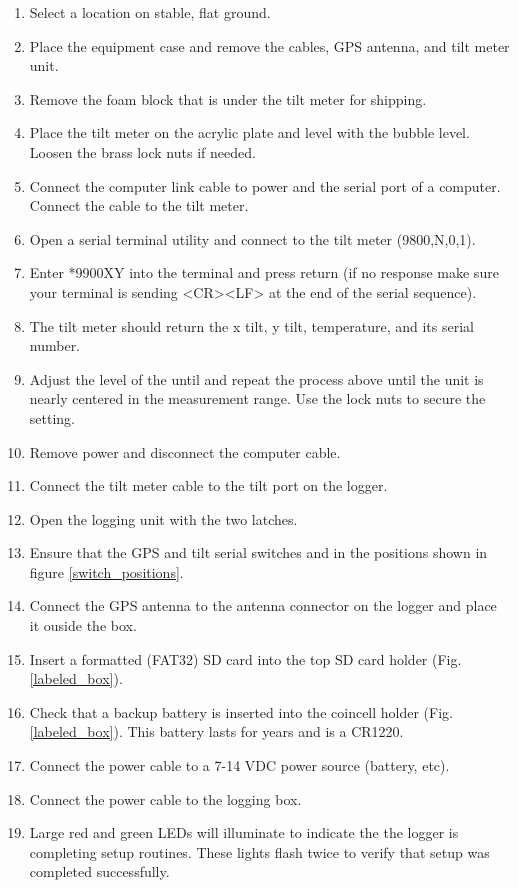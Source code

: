 \documentclass[11pt]{article} %
\begin{document}
\begin{enumerate}
\item Select a location on stable, flat ground.
\item Place the equipment case and remove the cables, GPS antenna, and tilt meter unit.
\item Remove the foam block that is under the tilt meter for shipping.
\item Place the tilt meter on the acrylic plate and level with the bubble level. Loosen the brass lock nuts if needed.
\item Connect the computer link cable to power and the serial port of a computer. Connect the cable to the tilt meter.
\item Open a serial terminal utility and connect to the tilt meter (9800,N,0,1).
\item Enter *9900XY into the terminal and press return (if no response make sure your terminal is sending <CR><LF> at the end of the serial sequence).
\item The tilt meter should return the x tilt, y tilt, temperature, and its serial number.
\item Adjust the level of the until and repeat the process above until the unit is nearly centered in the measurement range. Use the lock nuts to secure the setting.
\item Remove power and disconnect the computer cable. 
\item Connect the tilt meter cable to the tilt port on the logger.
\item Open the logging unit with the two latches.
\item Ensure that the GPS and tilt serial switches and in the positions shown in figure \ref{switch_positions}.
\item Connect the GPS antenna to the antenna connector on the logger and place it ouside the box.
\item Insert a formatted (FAT32) SD card into the top SD card holder (Fig.\ref{labeled_box}).
\item Check that a backup battery is inserted into the coincell holder (Fig.\ref{labeled_box}). This battery lasts for years and is a CR1220. 
\item Connect the power cable to a 7-14 VDC power source (battery, etc).
\item Connect the power cable to the logging box. 
\item Large red and green LEDs will illuminate to indicate the the logger is completing setup routines. These lights flash twice to verify that setup was completed successfully.

\end{enumerate}
\end{document}
